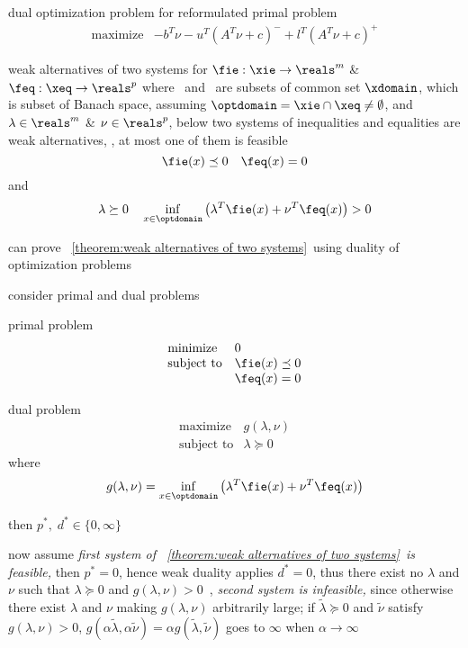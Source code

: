 \documentclass[17pt,landscape]{foils}
\begin{document}
{	\vitem
		dual optimization problem for reformulated primal problem
		$$
			\begin{array}{ll}
				\mbox{maximize} &
					-b^T \nu
					- u^T(A^T\nu + c)^-
					+ l^T(A^T\nu + c)^+
			\end{array}
		$$
	\eit
\eit
\vfill




\begin{mytheorem}{weak alternatives of two systems}
	for $\fie: \xie\to\reals^m$ \& $\feq: \xeq\to\reals^p$
	where \xie\ and \xeq\ are subsets of common set $\xdomain$,
	which is subset of Banach space,
	assuming $\optdomain = \xie \cap \xeq \neq \emptyset$,
	and
	$\lambda\in\reals^m$ \& $\nu\in\reals^p$,
	below two systems of inequalities and equalities are weak alternatives,
	\ie, at most one of them is feasible
		$$
				\fie(x) \preceq 0%
				\quad
				\feq(x) =0
		$$
		and
		$$
				\lambda \succeq 0%
				\quad
				\inf_{x\in\optdomain}
				\left(
					\lambda^T \fie(x) + \nu^T \feq(x)
				\right)
				>0
		$$
\end{mytheorem}

\bit
\vitem
	can prove \theoremname~\ref{theorem:weak alternatives of two systems}\
	using duality of optimization problems

\vitem
	consider primal and dual problems
	\bit
	\item primal problem
		$$
			\begin{array}{ll}
				\mbox{minimize} &
					0
				\\
				\mbox{subject to} &
					\fie(x) \preceq 0
				\\ &
					\feq(x) =0
			\end{array}
		$$
	\item dual problem
		$$
			\begin{array}{ll}
				\mbox{maximize} &
					g(\lambda,\nu)
				\\
				\mbox{subject to} &
					\lambda \succeq 0
			\end{array}
		$$
		where
		$$
			g(\lambda,\nu)
			=
				\inf_{x\in\optdomain}
				\left(
					\lambda^T \fie(x) + \nu^T \feq(x)
				\right)
		$$
	\eit

\vitem
	then
	$p^\ast,\; d^\ast \in \{0,\infty\}$

\vitem
	now assume \emph{first system of \theoremname~\ref{theorem:weak alternatives of two systems}\
	is feasible,} then $p^\ast = 0$, hence
	weak duality applies $d^\ast=0$,
	thus there exist no $\lambda$ and $\nu$ such that $\lambda\succeq 0$
	and $g(\lambda,\nu) > 0$\
	\ie, \emph{second system is infeasible,}
	since otherwise there exist $\lambda$ and $\nu$
	making $g(\lambda,\nu)$ arbitrarily large;
	if $\tilde{\lambda}\succeq 0$ and $\tilde{\nu}$
	satisfy $g({\lambda},{\nu})>0$,
	$g(\alpha\tilde{\lambda}, \alpha\tilde{\nu}) = \alpha g(\tilde{\lambda}, \tilde{\nu})$
	goes to $\infty$ when $\alpha\to\infty$

}
\end{document}
